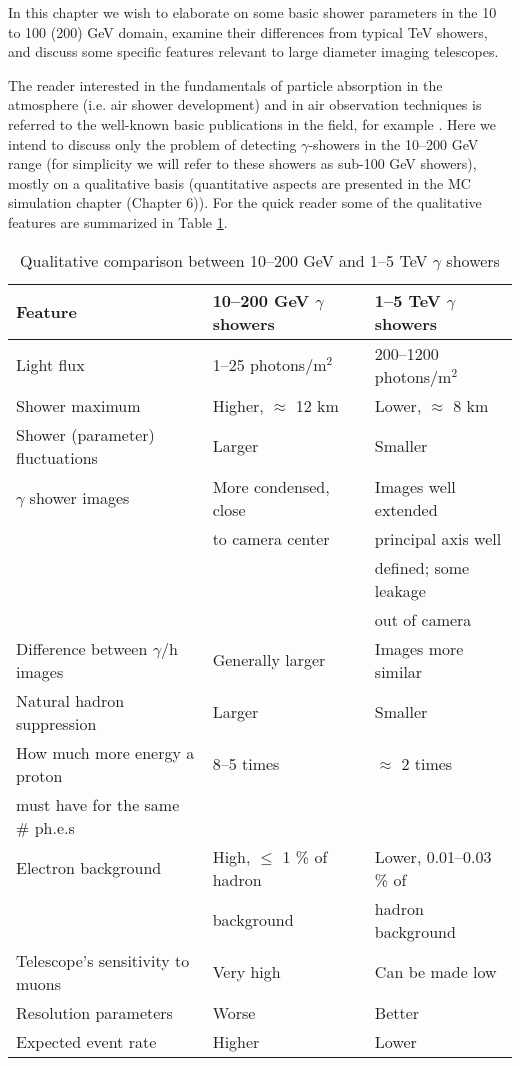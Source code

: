 \par\medskip In this chapter we wish to elaborate on some basic shower 
parameters in the 10 to 100 (200) 
GeV domain, examine their differences from typical TeV 
showers, and discuss some
specific features relevant to large diameter imaging telescopes.

The reader interested in the fundamentals of particle absorption
in the atmosphere (i.e. air 
shower development) and  in air \Cerenkov observation
techniques is referred to the well-known
basic publications in the field, for example 
\cite{gaisser:90,jelley:58,hillas:84,fegan:97}.
Here we intend to discuss 
only the problem of detecting $\gamma$-showers in the 10--200 GeV range
(for simplicity we will refer to these 
showers as sub-100 GeV showers), mostly on a qualitative
basis (quantitative aspects
are presented in the MC simulation chapter (Chapter 6)). For the quick
reader some of the qualitative 
features are summarized in Table \ref{tab:3.1}.

\begin{table}[h]
\centering
\caption{Qualitative comparison between 10--200 GeV and
 1--5 TeV $\gamma$ showers}
\vspace{0.3cm}
\begin{tabular}{lll}
\hline
Feature &10--200 GeV $\gamma$ showers&    1--5 TeV $\gamma$ showers\\
\hline
Light flux &     1--25 photons/m$^2$ &200--1200 photons/m$^2$\\
\hline
Shower maximum & Higher, $\approx$ 12 km &Lower, $\approx$ 8 km\\
\hline
Shower (parameter) fluctuations &Larger & Smaller\\
\hline
$\gamma$ shower images &More condensed, close &   Images well extended\\[-0.5ex]
      &  to camera center&   principal axis well \\[-0.5ex]
  &&              defined; some leakage \\
  &&              out of camera\\
\hline
Difference between $\gamma$/h images &  Generally larger & Images more similar\\
\hline
Natural hadron suppression   &   Larger&  Smaller\\
\hline
How much more energy a proton &  8--5 times &   
   $\approx$ 2 times\\[-0.5ex]
must have for the same \# ph.e.s&&\\
\hline
Electron background &    High, $\leq$ 1 \% of hadron & Lower, 0.01--0.03 \% 
of \\[-0.5ex]    
   &     background  &    hadron background\\
\hline
Telescope's sensitivity to muons  &Very high &      Can be made low\\
\hline
Resolution parameters  & Worse &  Better\\
\hline
Expected event rate  &   Higher & Lower\\
\hline
\end{tabular}
\label{tab:3.1}
\end{table}                         

